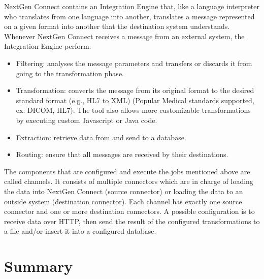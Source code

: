 NextGen Connect\cite{nextgen} contains an Integration Engine that, like a language interpreter who translates from one language into another, translates a message represented on a given format into another that the destination system understands.
Whenever NextGen Connect receives a message from an external system, the Integration Engine perform:
\begin{itemize}
    \item Filtering: analyses the message parameters and transfers or discards it from going to the transformation phase.
    \item Transformation: converts the message from its original format to the desired standard format (e.g., HL7 to XML) (Popular Medical standards supported, ex: DICOM, HL7). The tool also allows more customizable transformations by executing custom Javascript or Java code.
    \item Extraction: retrieve data from and send to a database.
    \item Routing: ensure that all messages are received by their destinations.
\end{itemize}
The components that are configured and execute the jobs mentioned above are called channels.
It consists of multiple connectors which are in charge of loading the data into NextGen Connect (source connector) or loading the data to an outside system (destination connector).
Each channel has exactly one source connector and one or more destination connectors.
A possible configuration is to receive data over HTTP, then send the result of the configured transformations to a file and/or insert it into a configured database.

\section{Summary}

